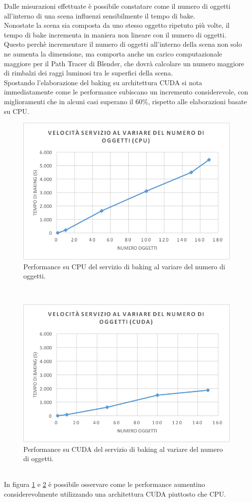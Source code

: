 Dalle misurazioni effettuate è possibile constatare come il numero di oggetti all’interno di una scena influenzi sensibilmente il tempo di bake. 
\\
Nonostate la scena sia composta da uno stesso oggetto ripetuto più volte, il tempo di bake incrementa in maniera non lineare con il numero di oggetti.
\\ 
Questo perchè incrementare il numero di oggetti all’interno della scena non solo ne aumenta la dimensione, ma comporta anche un carico computazionale maggiore per il Path Tracer di Blender, che dovrà calcolare un numero maggiore di rimbalzi dei raggi luminosi tra le superfici della scena.
\\
Spostando l’elaborazione del baking su architettura CUDA si nota immediatamente come le performance subiscano un incremento considerevole, con miglioramenti che in alcuni casi superano il 60\%, rispetto alle elaborazioni basate su CPU. 
\\
\begin{figure}[htb]
 \centering
 \includegraphics[width=0.6\linewidth]{images/chapter_prove_sperimentali/grafico1.png}\hfill
 \caption[Performance CPU variando oggetti]{Performance su CPU del servizio di baking al variare del numero di oggetti.}
 \label{fig:grafico1}
\end{figure}
\\
\begin{figure}[htb]
 \centering
 \includegraphics[width=0.6\linewidth]{images/chapter_prove_sperimentali/grafico2.png}\hfill
 \caption[Performance CUDA variando oggetti]{Performance su CUDA del servizio di baking al variare del numero di oggetti.}
 \label{fig:grafico2}
\end{figure}
\\
In figura \ref{fig:grafico1} e \ref{fig:grafico2} è possibile osservare come le performance aumentino considerevolmente utilizzando una architettura CUDA piuttosto che CPU.

